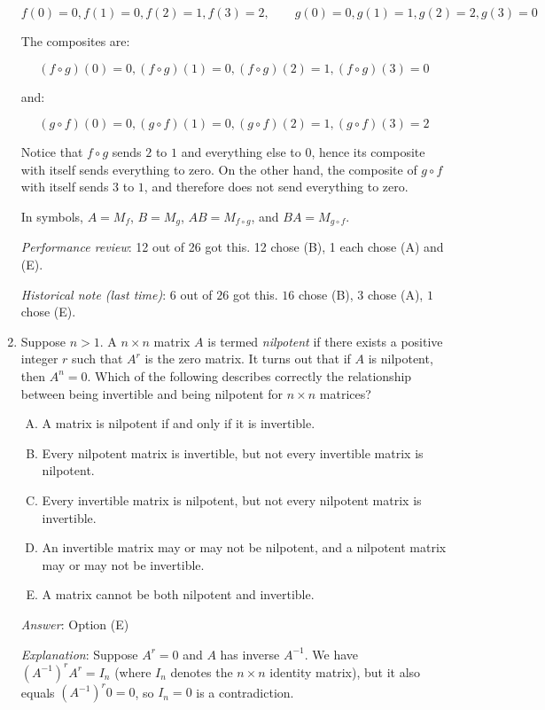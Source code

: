 \documentclass[10pt]{amsart}
\begin{document}
\begin{enumerate}
  $$f(0) = 0, f(1) = 0, f(2) = 1, f(3) = 2, \qquad g(0) = 0, g(1) = 1, g(2) = 2, g(3) = 0$$

  The composites are:

  $$(f \circ g)(0) = 0, (f \circ g)(1) = 0, (f \circ g)(2) = 1, (f \circ g)(3) = 0$$

  and:

  $$(g \circ f)(0) = 0, (g \circ f)(1) = 0, (g \circ f)(2) = 1, (g \circ f)(3) = 2$$

  Notice that $f \circ g$ sends $2$ to $1$ and everything else to $0$,
  hence its composite with itself sends everything to zero. On the
  other hand, the composite of $g \circ f$ with itself sends $3$ to
  $1$, and therefore does not send everything to zero.

  In symbols, $A = M_f$, $B = M_g$, $AB = M_{f \circ g}$, and $BA =
  M_{g \circ f}$.

  {\em Performance review}: 12 out of 26 got this. 12 chose (B), 1
  each chose (A) and (E).

  {\em Historical note (last time)}: $6$ out of $26$ got this. $16$
  chose (B), $3$ chose (A), $1$ chose (E).
\item Suppose $n > 1$. A $n \times n$ matrix $A$ is termed {\em
  nilpotent} if there exists a positive integer $r$ such that $A^r$ is
  the zero matrix. It turns out that if $A$ is nilpotent, then $A^n =
  0$. Which of the following describes correctly the relationship
  between being invertible and being nilpotent for $n \times n$
  matrices?

  \begin{enumerate}[(A)]
  \item A matrix is nilpotent if and only if it is invertible.
  \item Every nilpotent matrix is invertible, but not every invertible matrix is nilpotent.
  \item Every invertible matrix is nilpotent, but not every nilpotent matrix is invertible.
  \item An invertible matrix may or may not be nilpotent, and a
    nilpotent matrix may or may not be invertible.
  \item A matrix cannot be both nilpotent and invertible.
  \end{enumerate}

  {\em Answer}: Option (E)

  {\em Explanation}: Suppose $A^r = 0$ and $A$ has inverse
  $A^{-1}$. We have $(A^{-1})^rA^r = I_n$ (where $I_n$ denotes the $n
  \times n$ identity matrix), but it also equals $(A^{-1})^r0 = 0$, so
  $I_n = 0$ is a contradiction.


\end{enumerate}
\end{document}

